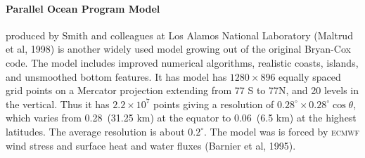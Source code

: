 \paragraph{Parallel Ocean Program Model}
produced by Smith and colleagues at Los
Alamos National Laboratory (Maltrud et al, 1998) is another widely
used model growing out of the original Bryan-Cox code. The model
includes improved numerical algorithms, realistic coasts, islands, and
unsmoothed bottom features. It has model has $1280 \times 896$ equally
spaced grid points on a Mercator projection extending from 77\degrees
S to 77\degrees N, and 20 levels in the vertical. Thus it has $2.2
\times 10^{7}$ points giving a resolution of $0.28^{\circ} \times
0.28^{\circ} \cos \theta $, which varies from 0.28\degrees\ (31.25 km)
at the equator to 0.06\degrees\ (6.5 km) at the highest latitudes. The
average resolution is about $0.2^{\circ}$. The model was is forced by
\textsc{ecmwf} wind stress and
surface heat and water fluxes (Barnier et al, 1995).

